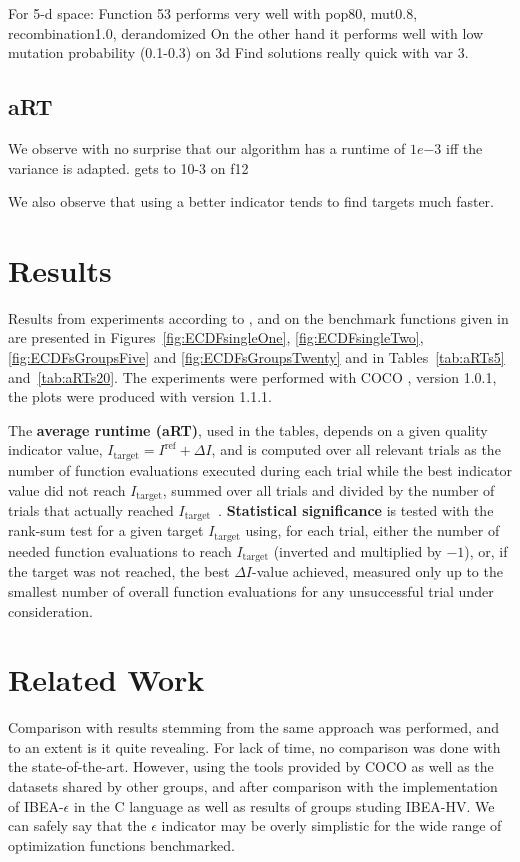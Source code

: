 \documentclass{sig-alternate}
\newcommand{\DI}{\ensuremath{\Delta I}}
\newcommand{\Itarget}{\ensuremath{I_\mathrm{target}}}
\newcommand{\change}[1]{{\color{red} #1}}
\newcommand{\hvref}{I^{\mathrm{ref}}}
\begin{document}
For 5-d space:
Function 53 performs very well with pop80, mut0.8, recombination1.0, derandomized
On the other hand it performs well with low mutation probability (0.1-0.3) on 3d
Find solutions really quick with var 3.

\subsection{aRT}
We observe with no surprise that our algorithm has a runtime of $1e{-3}$ iff the variance is adapted. gets to 10-3 on f12

We also observe that using a better indicator tends to find targets much faster.

\section{Results}

Results from experiments according to \cite{hansen2016exp},
\cite{hansen2016perfass} and \cite{biobj2016perfass} on the benchmark
functions given in \cite{biobj2016func} are presented in
Figures~\ref{fig:ECDFsingleOne}, \ref{fig:ECDFsingleTwo}, \ref{fig:ECDFsGroupsFive} and
\ref{fig:ECDFsGroupsTwenty} and in Tables~\ref{tab:aRTs5} and~\ref{tab:aRTs20}.
The experiments were performed with COCO \cite{hansen2016cocoplat}, version
\change{1.0.1}, the plots were produced with version \change{1.1.1}.

The \textbf{average runtime (aRT)}, used in the %
tables,
depends on a given quality indicator value, $\Itarget=\hvref+\DI$, and is
computed over all relevant trials as the number of function
evaluations executed during each trial while the best indicator value
did not reach \Itarget, summed over all trials and divided by the
number of trials that actually reached \Itarget\
\cite{hansen2016exp,price1997dev}.  \textbf{Statistical significance}
is tested with the rank-sum test for a given target $\Itarget$
using, for each trial,
either the number of needed function evaluations to reach
$\Itarget$ (inverted and multiplied by $-1$), or, if the target	
was not reached, the best $\DI$-value achieved, measured only up to
the smallest number of overall function evaluations for any
unsuccessful trial under consideration.


\section{Related Work}
Comparison with results stemming from the same approach was performed, and to an extent is it quite revealing. 
For lack of time, no comparison was done with the state-of-the-art. 
However, using the tools provided by COCO as well as the datasets shared by other groups, 
and after comparison with the implementation of IBEA-$\epsilon$ in the C language as well as results of groups studing IBEA-HV. 
We can safely say that the $\epsilon$ indicator may be overly simplistic for the wide range of optimization functions benchmarked.
\end{document}
